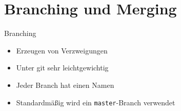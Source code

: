 \section{Branching und Merging}

\begin{frame}
  \tableofcontents[currentsection]
\end{frame}

\begin{frame}{Branching}
  \begin{itemize}
    \item Erzeugen von Verzweigungen
    \item Unter git sehr leichtgewichtig
    \item Jeder Branch hat einen Namen
    \item Standardmäßig wird ein \texttt{master}-Branch verwendet
  \end{itemize}
\end{frame}

